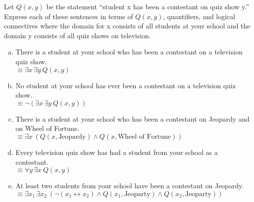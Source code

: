 \documentclass[11pt]{article}
\let\bicond\leftrightarrow
\begin{document}
\vspace*{0pt}

\begin{problem}{8}
Let $Q(x, y)$ be the statement ``student x has been a contestant on quiz show y.'' 
Express each of these sentences in terms of $Q(x, y)$, quantifiers, and logical connectives where the domain for x consists of all students at your school and the domain y consists of all quiz shows on television.

\begin{enumerate}[(a)]
\item There is a student at your school who has been a contestant on a television quiz show. \\
  $\equiv \exists x \, \exists y \ Q(x, y)$

\item No student at your school has ever been a contestant on a television quiz show. \\
  $\equiv \neg (\exists x \, \exists y \ Q(x, y))$

\item There is a student at your school who has been a contestant on Jeopardy and on Wheel of Fortune. \\
  $\equiv \exists x \ (Q(x, \textrm{Jeopardy}) \land Q(x, \textrm{Wheel of Fortune}))$

\item Every television quiz show has had a student from your school as a contestant. \\
  $\equiv \forall y \, \exists x \ Q(x, y)$

\item At least two students from your school have been a contestant on Jeopardy. \\
  $\equiv \exists x_1 \, \exists x_2 \ (\neg (x_1 \bicond x_2) \land Q(x_1, \textrm{Jeoparty}) \land Q(x_2, \textrm{Jeoparty}))$

\end{enumerate}

\end{problem}

\vspace*{0pt}
\end{document}
